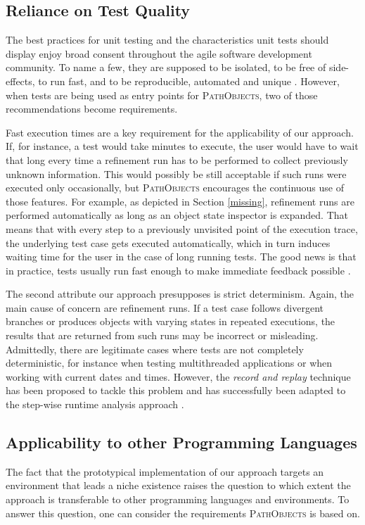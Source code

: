 \subsection{Reliance on Test Quality} 
\label{ss:DiscussionLimitationsTestQuality}
The best practices for unit testing and the characteristics unit tests should display enjoy broad consent throughout the agile software development community.
To name a few, they are supposed to be isolated, to be free of side-effects, to run fast, and to be reproducible, automated and unique \cite{meszaros_xunit_2006, beck_test_2002}.
However, when tests are being used as entry points for \textsc{PathObjects}, two of those recommendations become requirements.

Fast execution times are a key requirement for the applicability of our approach.
If, for instance, a test would take minutes to execute, the user would have to wait that long every time a refinement run has to be performed to collect previously unknown information.
This would possibly be still acceptable if such runs were executed only occasionally, but \textsc{PathObjects} encourages the continuous use of those features.
For example, as depicted in Section \ref{missing}, refinement runs are performed automatically as long as an object state inspector is expanded.
That means that with every step to a previously unvisited point of the execution trace, the underlying test case gets executed automatically, which in turn induces waiting time for the user in the case of long running tests. The good news is that in practice, tests usually run fast enough to make immediate feedback possible \cite{perscheid_immediacy_2010}.

The second attribute our approach presupposes is strict determinism.
Again, the main cause of concern are refinement runs.
If a test case follows divergent branches or produces objects with varying states in repeated executions, the results that are returned from such runs may be incorrect or misleading.
Admittedly, there are legitimate cases where tests are not completely deterministic, for instance when testing multithreaded applications or when working with current dates and times.
However, the \emph{record and replay} technique has been proposed to tackle this problem \cite{choi_deterministic_1998} and has successfully been adapted to the step-wise runtime analysis approach \cite{felgentreff_comparison_2012}.

\subsection{Applicability to other Programming Languages}
\label{s:DiscussionApplicability}
The fact that the prototypical implementation of our approach targets an environment that leads a niche existence raises the question to which extent the approach is transferable to other programming languages and environments.
To answer this question, one can consider the requirements \textsc{PathObjects} is based on.

